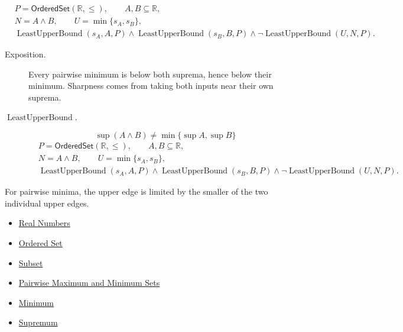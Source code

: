 \begin{remark*}
\[
\begin{aligned}
&P=\mathsf{OrderedSet}(\mathbb{R},\leq),\qquad A,B\subseteq\mathbb{R},\\
&N=A\wedge B,\qquad U=\min\{s_A,s_B\},\\
&\operatorname{LeastUpperBound}(s_A,A,P)\land\operatorname{LeastUpperBound}(s_B,B,P)\land
\neg\operatorname{LeastUpperBound}(U,N,P).
\end{aligned}
\]
\end{remark*}

\begin{remark*}
\begin{description}
\item[Exposition.]
Every pairwise minimum is below both suprema, hence below their minimum.
Sharpness comes from taking both inputs near their own suprema.


  \item[\(\operatorname{LeastUpperBound}.\)]
  \[
\sup(A\wedge B)\neq\min\{\sup A,\sup B\}
\]
\[
\begin{aligned}
&P=\mathsf{OrderedSet}(\mathbb{R},\leq),\qquad A,B\subseteq\mathbb{R},\\
&N=A\wedge B,\qquad U=\min\{s_A,s_B\},\\
&\operatorname{LeastUpperBound}(s_A,A,P)\land\operatorname{LeastUpperBound}(s_B,B,P)\land
\neg\operatorname{LeastUpperBound}(U,N,P).
\end{aligned}
\]
\end{description}
\end{remark*}

\begin{remark*}[Interpretation]
For pairwise minima, the upper edge is limited by the smaller of the two
individual upper edges.
\end{remark*}

\begin{dependencies}
\begin{itemize}
  \item \hyperref[def:reals]{Real Numbers}
  \item \hyperref[def:ordered-set]{Ordered Set}
  \item \hyperref[def:subset]{Subset}
  \item \hyperref[def:pairwise-maximum-minimum-sets]{Pairwise Maximum and Minimum Sets}
  \item \hyperref[def:minimum]{Minimum}
  \item \hyperref[def:supremum]{Supremum}
\end{itemize}
\end{dependencies}

